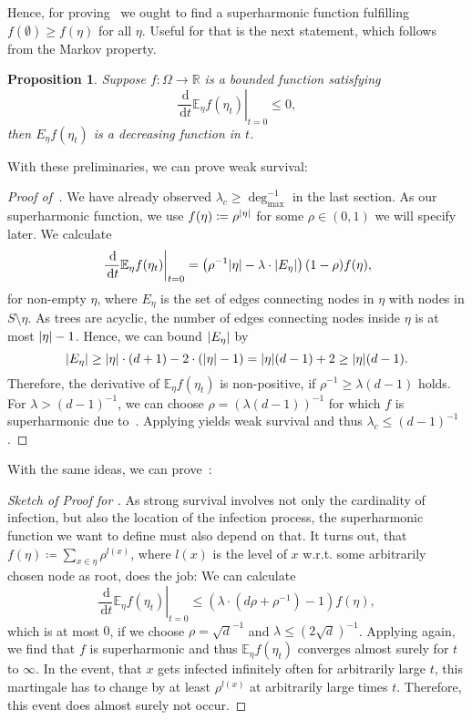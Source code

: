 \documentclass[a4paper,11pt]{amsart}
\theoremstyle{theorem}
\newtheorem{proposition}[theorem]{Proposition}
\theoremstyle{definition}
\newcommand{\diff}{\,\mathrm{d}}
\newcommand{\R}{\mathbb{R}}
\newcommand{\E}{\mathbb{E}}
\DeclarePairedDelimiter\abs{\lvert}{\rvert}%
\begin{document}
Hence, for proving~ we ought to find a superharmonic function fulfilling $f(\emptyset) \geq f(\eta)$ for all $\eta.$
Useful for that is the next statement, which follows from the Markov property.
\begin{proposition}\label{prop:superharmon}
	Suppose $f:\Omega \to \R$ is a bounded function satisfying $$\left. \frac{\diff}{\diff t} \E_\eta f(\eta_t) \right|_{t=0}\leq 0,$$
	then $E_\eta f(\eta_t)$ is a decreasing function in $t$.
\end{proposition}

With these preliminaries, we can prove weak survival:
\begin{proof}[Proof of~]
We have already observed $\lambda_c \geq \deg_{\max}^{-1}$ in the last section.
As our superharmonic function, we use $f(\eta)\coloneqq \rho^{\abs{\eta}}$ for some $\rho\in(0,1)$ we will specify later.
We calculate $$\left.\frac{\diff}{\diff t}\E_\eta f(\eta_t) \right|_{t=0}
= \left( \rho^{-1}\abs{\eta} - \lambda \cdot \abs{E_\eta} \right) (1-\rho) f(\eta),
$$
for non-empty $\eta$, where $E_\eta$ is the set of edges connecting nodes in $\eta$ with nodes in $S\setminus \eta$.
As trees are acyclic, the number of edges connecting nodes inside $\eta$ is at most $\abs{\eta}-1$.
Hence, we can bound $\abs{E_\eta}$ by
$$\abs{E_\eta} \geq \abs{\eta} \cdot (d+1) - 2\cdot(\abs{\eta} - 1) = \abs{\eta}(d - 1) + 2 \geq \abs{\eta} (d-1).$$
Therefore, the derivative of $\E_\eta f(\eta_t)$ is non-positive, if 
$\rho^{-1} \geq \lambda(d-1)$ holds.
For $\lambda > (d-1)^{-1}$, we can choose $\rho = (\lambda (d-1))^{-1}$ for which $f$ is superharmonic due to~.
Applying  yields weak survival and thus $\lambda_c \leq (d-1)^{-1}$.
\end{proof}

With the same ideas, we can prove~:
\begin{proof}[Sketch of Proof for ]
As strong survival involves not only the cardinality of infection, but also the location of the infection process, the superharmonic function we want to define must also depend on that.
It turns out, that $f(\eta) \coloneqq \sum_{x\in\eta} \rho^{l(x)}$, where $l(x)$ is the level of $x$ w.r.t. some arbitrarily chosen node as root, does the job:
We can calculate $$\left. \frac{\diff}{\diff t} \E_\eta f(\eta_t) \right|_{t=0} \leq \left( \lambda \cdot (d\rho + \rho^{-1}) - 1 \right)f(\eta),$$
which is at most $0$, if we choose $\rho=\sqrt{d}^{-1}$ and $\lambda\leq(2\sqrt{d})^{-1}$.
Applying  again, we find that $f$ is superharmonic and thus $\E_\eta f(\eta_t)$ converges almost surely for $t$ to $\infty$.
In the event, that $x$ gets infected infinitely often for arbitrarily large $t$, this martingale has to change by at least $\rho^{l(x)}$ at arbitrarily large times $t$.
Therefore, this event does almost surely not occur.
\end{proof}
\end{document}
